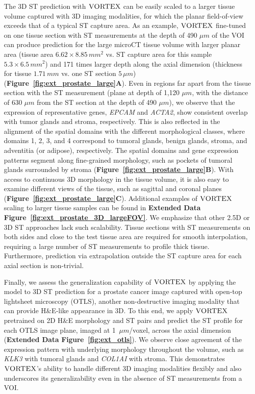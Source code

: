 The 3D ST prediction with $\textsc{VORTEX}$ can be easily scaled to a larger tissue volume captured with 3D imaging modalities, for which the planar field-of-view exceeds that of a typical ST capture area. As an example, $\textsc{VORTEX}$ fine-tuned on one tissue section with ST measurements at the depth of 490 $\mu m$ of the VOI can produce prediction for the large microCT tissue volume with larger planar area (tissue area $6.62\times 8.85\, mm^2$ vs. ST capture area for this sample $5.3 \times 6.5 \,mm^2$) and 171 times larger depth along the axial dimension (thickness for tissue $1.71 \,mm$ vs. one ST section $5 \,\mu m$) (\textbf{Figure~\ref{fig:ext_prostate_large}A}). Even in regions far apart from the tissue section with the ST measurement (plane at depth of 1,120 $\mu m$, with the distance of 630 $\mu m$ from the ST section at the depth of 490 $\mu m$), we observe that the expression of representative genes, \textit{EPCAM} and \textit{ACTA2}, show consistent overlap with tumor glands and stroma, respectively. This is also reflected in the alignment of the spatial domains with the different morphological classes, where domains 1, 2, 3, and 4 correspond to tumoral glands, benign glands, stroma, and adventitia (or adipose), respectively.
The spatial domains and gene expression patterns segment along fine-grained morphology, such as pockets of tumoral glands surrounded by stroma (\textbf{Figure~\ref{fig:ext_prostate_large}B}).
With access to continuous 3D morphology in the tissue volume, it is also easy to examine different views of the tissue, such as sagittal and coronal planes (\textbf{Figure~\ref{fig:ext_prostate_large}C}). Additional examples of $\textsc{VORTEX}$ scaling to larger tissue samples can be found in \textbf{Extended Data Figure~\ref{fig:ext_prostate_3D_largeFOV}}.
We emphasize that other 2.5D or 3D ST approaches lack such scalability. Tissue sections with ST measurements on both sides and close to the test tissue area are required for smooth interpolation, requiring a large number of ST measurements to profile thick tissue. Furthermore, prediction via extrapolation outside the ST capture area for each axial section is non-trivial.  

Finally, we assess the generalization capability of $\textsc{VORTEX}$ by applying the model to 3D ST prediction for a prostate cancer image captured with open-top lightsheet microscopy (OTLS), another non-destructive imaging modality that can provide H\&E-like appearance in 3D\cite{bishop2024end}. To this end, we apply $\textsc{VORTEX}$ pretrained on 2D H\&E morphology and ST pairs and predict the ST profile for each OTLS image plane, imaged at 1~$\mu m$/voxel, across the axial dimension (\textbf{Extended Data Figure~\ref{fig:ext_otls}}). We observe close agreement of the expression pattern with underlying morphology throughout the volume, such as \textit{KLK3} with tumoral glands and \textit{COL1AI} with stroma. This demonstrates $\textsc{VORTEX}$'s ability to handle different 3D imaging modalities flexibly and also underscores its generalizability even in the absence of ST measurements from a VOI.

